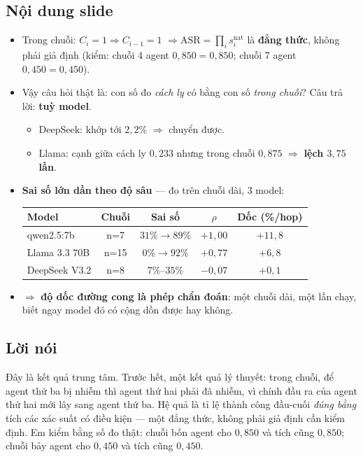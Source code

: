 \documentclass[11pt,a4paper]{article}
\newcommand{\noidung}{\subsection*{Nội dung slide}}
\newcommand{\loinoi}{\subsection*{Lời nói}}
\begin{document}
\noidung
\begin{itemize}
  \item Trong chuỗi: $C_i{=}1 \Rightarrow C_{i-1}{=}1$
        $\Rightarrow \mathrm{ASR}=\prod_i s_i^{\mathrm{nat}}$ là \textbf{đẳng thức}, không
        phải giả định (kiểm: chuỗi 4 agent $0{,}850=0{,}850$; chuỗi 7 agent
        $0{,}450=0{,}450$).
  \item Vậy câu hỏi thật là: con số đo \emph{cách ly} có bằng con số \emph{trong chuỗi}?
        Câu trả lời: \textbf{tuỳ model}.
        \begin{itemize}
          \item DeepSeek: khớp tới $2{,}2\%$ $\Rightarrow$ chuyển được.
          \item Llama: cạnh giữa cách ly $0{,}233$ nhưng trong chuỗi $0{,}875$
                $\Rightarrow$ \textbf{lệch $3{,}75$ lần}.
        \end{itemize}
  \item \textbf{Sai số lớn dần theo độ sâu} --- đo trên chuỗi dài, 3 model:
        \begin{center}
        \small
        \begin{tabular}{|l|c|c|c|c|}
        \hline
        \textbf{Model} & \textbf{Chuỗi} & \textbf{Sai số} & \textbf{$\rho$} & \textbf{Dốc (\%/hop)}\\
        \hline
        qwen2.5:7b & n=7 & $31\%\to 89\%$ & $+1{,}00$ & $+11{,}8$\\
        Llama 3.3 70B & n=15 & $0\%\to 92\%$ & $+0{,}77$ & $+6{,}8$\\
        DeepSeek V3.2 & n=8 & $7\%$--$35\%$ & $-0{,}07$ & $+0{,}1$\\
        \hline
        \end{tabular}
        \end{center}
  \item $\Rightarrow$ \textbf{độ dốc đường cong là phép chẩn đoán}: một chuỗi dài, một
        lần chạy, biết ngay model đó có cộng dồn được hay không.
\end{itemize}

\loinoi
Đây là kết quả trung tâm. Trước hết, một kết quả lý thuyết: trong chuỗi, để agent thứ ba
bị nhiễm thì agent thứ hai phải đã nhiễm, vì chính đầu ra của agent thứ hai mới lây sang
agent thứ ba. Hệ quả là tỉ lệ thành công đầu-cuối \emph{đúng bằng} tích các xác suất có
điều kiện --- một đẳng thức, không phải giả định cần kiểm định. Em kiểm bằng số đo thật:
chuỗi bốn agent cho $0{,}850$ và tích cũng $0{,}850$; chuỗi bảy agent cho $0{,}450$ và
tích cũng $0{,}450$.
\end{document}
